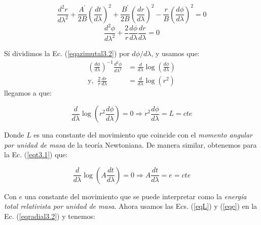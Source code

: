 \begin{equation}
    \frac{d^2 r}{d \lambda^2} + \frac{A^\prime}{2B} \left(\frac{d t}{d \lambda}\right)^2 + \frac{B^\prime}{2B} \left(\frac{d r}{d \lambda}\right)^2 -  \frac{r}{B} \left(\frac{d \phi}{d \lambda}\right)^2 = 0
\label{eqradial3.2}
\end{equation}
\begin{equation}
    \frac{d^2 \phi}{d \lambda^2} + \frac{2}{r} \frac{d \phi}{d \lambda} \frac{d r}{d \lambda}= 0
\label{eqazimutal3.2}
\end{equation}

Sí dividimos la Ec. (\ref{eqazimutal3.2}) por $d\phi/d\lambda$, y usamos que:
\begin{equation}
\begin{split}
    \left(\frac{d\phi}{d\lambda}\right)^{-1} \frac{d^2\phi}{d\lambda^2} &= \frac{d}{d\lambda} \log{\left(\frac{d\phi}{d\lambda}\right)}\\
    \text{y, }\ \frac{2}{r} \frac{dr}{d\lambda} &= \frac{d}{d\lambda}\log{(r^2)}
\end{split}
\end{equation}
llegamos a que:

\begin{equation}
    \frac{d}{d\lambda}\log{\left(r^2\frac{d\phi}{d\lambda}\right)}=0 \Rightarrow r^2 \frac{d\phi}{d\lambda} = L = cte
\label{eqL}
\end{equation}

Donde $L$ es una constante del movimiento que coincide con el \textit{momento angular por unidad de masa} de la teoría Newtoniana. De manera similar, obtenemos para la Ec. (\ref{eqt3.1}) que:

\begin{equation}
    \frac{d}{d\lambda}\log{\left(A\frac{dt}{d\lambda}\right)}=0 \Rightarrow A \frac{dt}{d\lambda} = e = cte
\label{eqe}
\end{equation}

Con $e$ una constante del movimiento que se puede interpretar como la \textit{energía total relativista por unidad de masa}. Ahora usamos las Ecs. (\ref{eqL}) y (\ref{eqe}) en la Ec. (\ref{eqradial3.2}) y tenemos:

